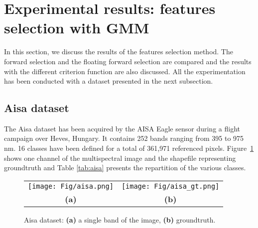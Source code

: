 \documentclass[a4paper,11pt,DIV=16,abstracton]{scrartcl}
\begin{document}
\section{Experimental results: features selection with GMM}
\label{sec:gmm-results}

In this section, we discuss the results of the features selection method. The forward selection and the floating forward selection are compared and the results with the different criterion function are also discussed. All the experimentation has been conducted with a dataset presented in the next subsection.

    \subsection{Aisa dataset}
    \label{sec:aisa}
    The Aisa dataset has been acquired by the AISA Eagle sensor during a flight campaign over Heves, Hungary. It contains 252 bands ranging from 395 to 975 nm. 16 classes have been defined for a total of 361,971 referenced pixels. Figure~\ref{fig:aisa} shows one channel of the multispectral image and the shapefile representing groundtruth and Table \ref{tab:aisa} presents the repartition of the various classes.

    \begin{figure}[!ht]
        \centering
        \begin{tabular}{cc}
            \texttt{[image: Fig/aisa.png]} &
            \texttt{[image: Fig/aisa\_gt.png]} \\
            {\bfseries{(a)}} & {\bfseries{(b)}} \\
        \end{tabular}
        \caption{Aisa dataset: {\bfseries{(a)}} a single band of the image, {\bfseries{(b)}} groundtruth.\label{fig:aisa}}
    \end{figure}
\end{document}
